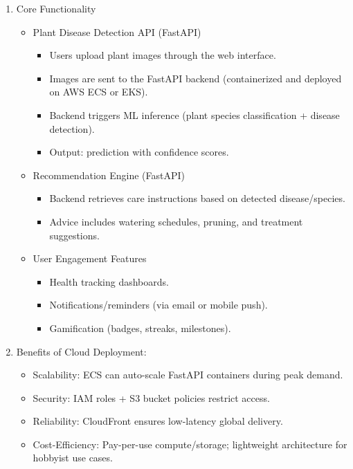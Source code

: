 \documentclass[11pt]{article}
\begin{document}
\begin{enumerate}
    \item Core Functionality
    \begin{itemize}
        \item Plant Disease Detection API (FastAPI)
        \begin{itemize}
            \item Users upload plant images through the web interface.
            \item Images are sent to the FastAPI backend (containerized and deployed on AWS ECS or EKS).
            \item Backend triggers ML inference (plant species classification + disease detection).
            \item Output: prediction with confidence scores.
        \end{itemize}

        \item Recommendation Engine (FastAPI)
        \begin{itemize}
            \item Backend retrieves care instructions based on detected disease/species.
            \item  Advice includes watering schedules, pruning, and treatment suggestions.
        \end{itemize}

        \item User Engagement Features
        \begin{itemize}
            \item Health tracking dashboards.
            \item Notifications/reminders (via email or mobile push).
            \item Gamification (badges, streaks, milestones).
        \end{itemize}
\end{itemize}

\item Benefits of Cloud Deployment:
\begin{itemize}
    \item Scalability: ECS can auto-scale FastAPI containers during peak demand.
    \item Security: IAM roles + S3 bucket policies restrict access.
    \item Reliability: CloudFront ensures low-latency global delivery.
    \item Cost-Efficiency: Pay-per-use compute/storage; lightweight architecture for hobbyist use cases.
\end{itemize}

\end{enumerate}
\end{document}
